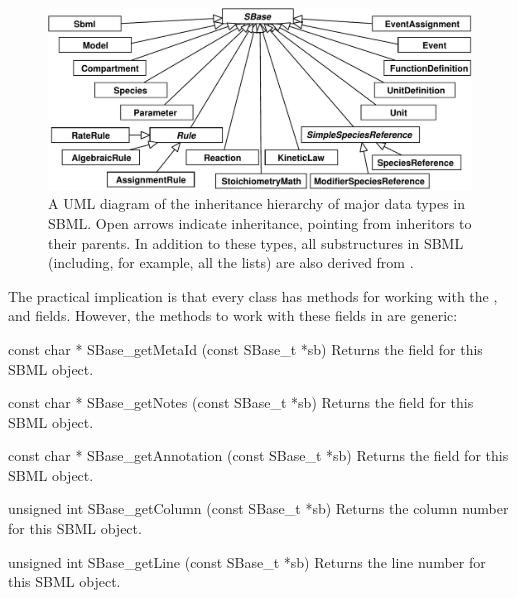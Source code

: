 \documentclass{sbmlmanual}
\begin{document}
\begin{figure}[hbt]
  \centering
  \includegraphics[scale = 0.7]{graphics/top-level}
  \caption{A UML diagram of the inheritance hierarchy of major data types
    in SBML.  Open arrows indicate inheritance, pointing from inheritors to
    their parents.  In addition to these types, all substructures in SBML
    (including, for example, all the  lists) are also derived
    from .}
  \label{fig:top-level}
\end{figure}


The practical implication is that every class has methods for working with
the ,  and  fields.
However, the methods to work with these fields in \libsbml{} are generic:


\begin{methoddef}{const char * SBase\_getMetaId (const SBase\_t *sb)}
  Returns the  field for this SBML object.
\end{methoddef}


\begin{methoddef}{const char * SBase\_getNotes (const SBase\_t *sb)}
  Returns the  field for this SBML object.
\end{methoddef}


\begin{methoddef}{const char * SBase\_getAnnotation (const SBase\_t *sb)}
  Returns the  field for this SBML object.
\end{methoddef}


\begin{methoddef}{unsigned int SBase\_getColumn (const SBase\_t *sb)}
  Returns the column number for this SBML object.
\end{methoddef}


\begin{methoddef}{unsigned int SBase\_getLine (const SBase\_t *sb)}
  Returns the line number for this SBML object.
\end{methoddef}
\end{document}
